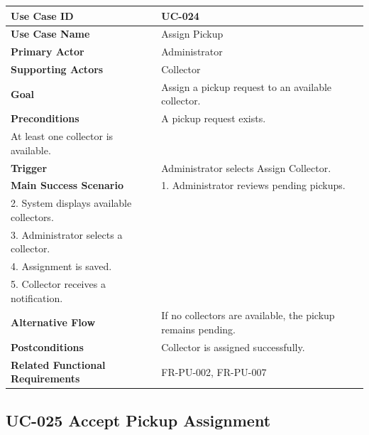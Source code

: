 \begin{longtable}{|p{4cm}|p{10cm}|}

\hline
\textbf{Use Case ID} &
UC-024 \\
\hline

\textbf{Use Case Name} &
Assign Pickup \\
\hline

\textbf{Primary Actor} &
Administrator \\
\hline

\textbf{Supporting Actors} &
Collector \\
\hline

\textbf{Goal} &
Assign a pickup request to an available collector. \\
\hline

\textbf{Preconditions} &
A pickup request exists.\\
At least one collector is available. \\
\hline

\textbf{Trigger} &
Administrator selects Assign Collector. \\
\hline

\textbf{Main Success Scenario} &
1. Administrator reviews pending pickups.\\
2. System displays available collectors.\\
3. Administrator selects a collector.\\
4. Assignment is saved.\\
5. Collector receives a notification.\\
\hline

\textbf{Alternative Flow} &
If no collectors are available, the pickup remains pending.\\
\hline

\textbf{Postconditions} &
Collector is assigned successfully.\\
\hline

\textbf{Related Functional Requirements} &
FR-PU-002, FR-PU-007 \\
\hline

\end{longtable}

\subsection{UC-025 Accept Pickup Assignment}

